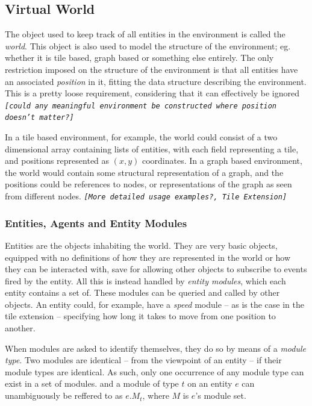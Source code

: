 
\subsection{Virtual World}

The object used to keep track of all entities in the environment is
called the \emph{world}. This object is also used to model the structure
of the environment; eg. whether it is tile based, graph based or something
else entirely. The only restriction imposed on the structure of the
environment is that all entities have an associated \emph{position}
in it, fitting the data structure describing the environment. This
is a pretty loose requirement, considering that it can effectively
be ignored \texttt{\emph{{[}could any meaningful environment be constructed
where position doesn't matter?{]}}}

In a tile based environment, for example, the world could consist
of a two dimensional array containing lists of entities, with each
field representing a tile, and positions represented as $(x,y)$ coordinates.
In a graph based environment, the world would contain some structural
representation of a graph, and the positions could be references to
nodes, or representations of the graph as seen from different nodes.
\texttt{\emph{{[}More detailed usage examples?, Tile Extension{]}}}


\subsubsection{Entities, Agents and Entity Modules\label{sub:SysFeatEntities}}

Entities are the objects inhabiting the world. They are very basic
objects, equipped with no definitions of how they are represented
in the world or how they can be interacted with, save for allowing
other objects to subscribe to events fired by the entity. All this
is instead handled by \emph{entity modules}, which each entity contains
a set of. These modules can be queried and called by other objects.
An entity could, for example, have a \emph{speed} module -- as is
the case in the tile extension -- specifying how long it takes to
move from one position to another.

When modules are asked to identify themselves, they do so by means
of a \emph{module type}. Two modules are identical -- from the viewpoint
of an entity -- if their module types are identical. As such, only
one occurrence of any module type can exist in a set of modules. and
a module of type $t$ on an entity $e$ can unambiguously be reffered
to as $e.M_{t}$, where $M$ is $e$'s module set. 

